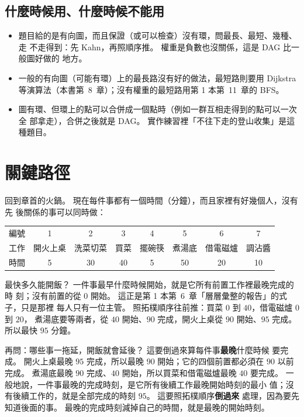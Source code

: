 \subsection{什麼時候用、什麼時候不能用}

\begin{itemize}
\item 題目給的是有向圖，而且保證（或可以檢查）沒有環，問最長、最短、幾種、走
不走得到：先 Kahn，再照順序推。 權重是負數也沒關係，這是 DAG 比一般圖好做的
地方。
\item 一般的有向圖（可能有環）上的最長路沒有好的做法，最短路則要用
Dijkstra 等演算法（本書第~8~章）；沒有權重的最短路用第 1 本第~11~章的 BFS。
\item 圖有環、但環上的點可以合併成一個點時（例如一群互相走得到的點可以一次全
部拿走），合併之後就是 DAG。 實作練習裡「不往下走的登山收集」是這種題目。
\end{itemize}

\section{關鍵路徑}
\label{sec:critical-path}

回到章首的火鍋。 現在每件事都有一個時間（分鐘），而且家裡有好幾個人，沒有先
後關係的事可以同時做：

\begin{center}
\begin{tabular}{lccccccc}
\toprule
編號 & 1 & 2 & 3 & 4 & 5 & 6 & 7 \\
工作 & 開火上桌 & 洗菜切菜 & 買菜 & 擺碗筷 & 煮湯底 & 借電磁爐 & 調沾醬 \\
時間 & 5 & 30 & 40 & 5 & 50 & 20 & 10 \\
\bottomrule
\end{tabular}
\end{center}

最快多久能開飯？ 一件事最早什麼時候開始，就是它所有前置工作裡最晚完成的時
刻；沒有前置的從 $0$ 開始。 這正是第 1 本第~6~章「層層彙整的報告」的式子，只是那裡
每人只有一位主管。 照拓樸順序往前推：買菜 $0$ 到 $40$，借電磁爐 $0$ 到 $20$，
煮湯底要等兩者，從 $40$ 開始、$90$ 完成，開火上桌從 $90$ 開始、$95$ 完成。
所以最快 $95$ 分鐘。

再問：哪些事一拖延，開飯就會延後？ 這要倒過來算每件事\textbf{最晚}什麼時候
要完成。 開火上桌最晚 $95$ 完成，所以最晚 $90$ 開始；它的四個前置都必須在
$90$ 以前完成。 煮湯底最晚 $90$ 完成、$40$ 開始，所以買菜和借電磁爐最晚 $40$
要完成。 一般地說，一件事最晚的完成時刻，是它所有後續工作最晚開始時刻的最小
值；沒有後續工作的，就是全部完成的時刻 $95$。 這要照拓樸順序\textbf{倒過來}
處理，因為要先知道後面的事。 最晚的完成時刻減掉自己的時間，就是最晚的開始時刻。


